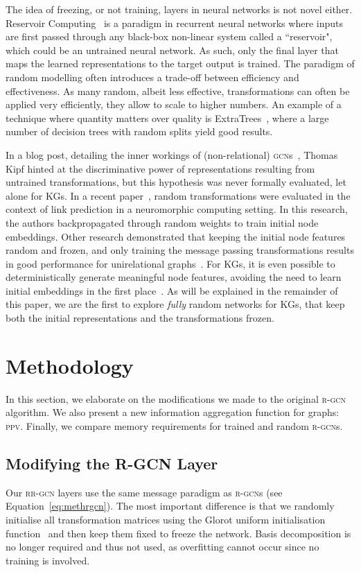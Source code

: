 \documentclass{llncs}
\begin{document}
The idea of freezing, or not training, layers in neural networks is not novel either. Reservoir Computing~\cite{reservoir} is a paradigm in recurrent neural networks where inputs are first passed through any black-box non-linear system called a ``reservoir", which could be an untrained neural network. As such, only the final layer that maps the learned representations to the target output is trained.
The paradigm of random modelling often introduces a trade-off between efficiency and effectiveness. As many random, albeit less effective, transformations can often be applied very efficiently, they allow to scale to higher numbers. An example of a technique where quantity matters over quality is ExtraTrees~\cite{geurts2006extremely}, where a large number of decision trees with random splits yield good results.

In a blog post, detailing the inner workings of (non-relational) \textsc{gcn}s~\cite{kipfblog}, Thomas Kipf hinted at the discriminative power of representations resulting from untrained transformations, but this hypothesis was never formally evaluated, let alone for KGs. In a recent paper~\cite{chian2021learning}, random transformations were evaluated in the context of link prediction in a neuromorphic computing setting. In this research, the authors backpropagated through random weights to train initial node embeddings. Other research demonstrated that keeping the initial node features random and frozen, and only training the message passing transformations results in good performance for unirelational graphs~\cite{surprising,randomfeatures}. For KGs, it is even possible to deterministically generate meaningful node features, avoiding the need to learn initial embeddings in the first place~\cite{nodepiece}.
As will be explained in the remainder of this paper, we are the first to explore \emph{fully} random networks for KGs, that keep both the initial representations and the transformations frozen.

\section{Methodology} \label{sec:method}
In this section, we elaborate on the modifications we made to the original \textsc{r-gcn} algorithm. We also present a new information aggregation function for graphs: \textsc{ppv}. Finally, we compare memory requirements for trained and random \textsc{r-gcn}s.

\subsection{Modifying the R-GCN Layer}
Our \textsc{rr-gcn} layers use the same message paradigm as \textsc{r-gcn}s (see Equation~\ref{eq:methrgcn}). The most important difference is that we randomly initialise all transformation matrices using the Glorot uniform initialisation function~\cite{glorot} and then keep them fixed to freeze the network. Basis decomposition is no longer required and thus not used, as overfitting cannot occur since no training is involved.
\end{document}
